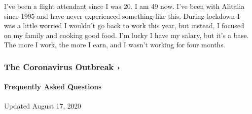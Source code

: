 I've been a flight attendant since I was 20. I am 49 now. I've been with
Alitalia since 1995 and have never experienced something like this.
During lockdown I was a little worried I wouldn't go back to work this
year, but instead, I focused on my family and cooking good food. I'm
lucky I have my salary, but it's a base. The more I work, the more I
earn, and I wasn't working for four months.

\href{https://www.nytimes3xbfgragh.onion/news-event/coronavirus?action=click\&pgtype=Article\&state=default\&region=MAIN_CONTENT_3\&context=storylines_faq}{}

\hypertarget{the-coronavirus-outbreak-}{%
\subsubsection{The Coronavirus Outbreak
›}\label{the-coronavirus-outbreak-}}

\hypertarget{frequently-asked-questions}{%
\paragraph{Frequently Asked
Questions}\label{frequently-asked-questions}}

Updated August 17, 2020

